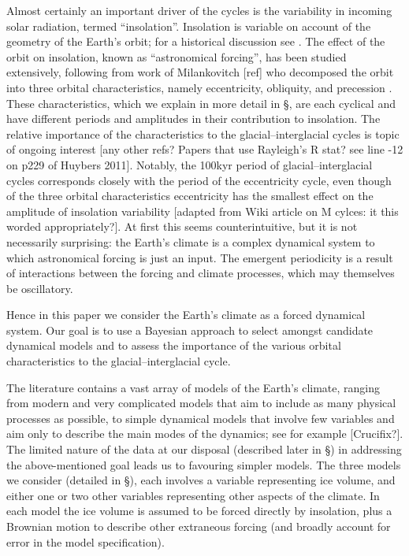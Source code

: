 \documentclass[a4paper,12pt]{article}
\begin{document}
Almost certainly an important driver of the cycles is the variability in incoming solar
radiation, termed ``insolation''.  Insolation is variable on account of the geometry of the
Earth's orbit; for a historical discussion see \cite{Berger2004}.  The effect of the orbit
on insolation, known as ``astronomical forcing'', has been studied extensively, following
from work of Milankovitch [ref] who decomposed the orbit into three orbital characteristics,
namely eccentricity, obliquity, and precession \cite{Hays1976}.  These characteristics,
which we explain in more detail in \S, are each cyclical and have different periods and
amplitudes in their contribution to insolation.  The relative importance of the
characteristics to the glacial--interglacial cycles is topic of ongoing interest
\cite{Huybers2005,Lisiecki2010,Huybers2011} [any other refs?  Papers that use Rayleigh's R
stat? see line -12 on p229 of Huybers 2011].  Notably, the 100kyr period of
glacial--interglacial cycles corresponds closely with the period of the eccentricity cycle,
even though of the three orbital characteristics eccentricity has the smallest effect on the
amplitude of insolation variability [adapted from Wiki article on M cylces: it this worded
appropriately?].  At first this seems counterintuitive, but it is not necessarily
surprising: the Earth's climate is a complex dynamical system to which astronomical forcing
is just an input.  The emergent periodicity is a result of interactions between the forcing
and climate processes, which may themselves be oscillatory.

Hence in this paper we consider the Earth's climate as a forced dynamical system.  
Our goal is to use a Bayesian approach to select amongst candidate dynamical models and
to assess the importance of the various orbital characteristics to the
glacial--interglacial cycle.

The literature contains a vast array of models of the Earth's climate, ranging from
modern and very complicated models that aim to include as many physical processes as
possible, to simple dynamical models that involve few variables and aim only to describe
the main modes of the dynamics; see for example [Crucifix?].  
The limited nature of the data at our disposal (described later in \S) in addressing the
above-mentioned goal leads us 
to favouring simpler models.  The three models we consider (detailed in \S), each
involves a variable representing ice volume, and either one or two other variables
representing other aspects of the climate.  In each model the ice volume is assumed to
be forced directly by insolation, plus a Brownian motion to describe other extraneous
forcing (and broadly account for error in the model specification).  
\end{document}
